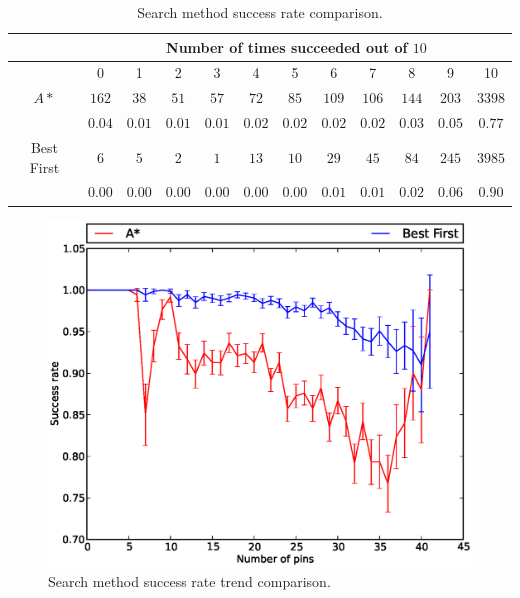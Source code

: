 \begin{table}[H]
\begin{center}
\begin{singlespace}
\begin{tabular}{|c||c|c|c|c|c|c|c|c|c|c|c|}
\hline
 & \multicolumn{11}{|c|}{Number of times succeeded out of $10$} \\
\hline
 & 0 & 1 & 2 & 3 & 4 & 5 & 6 & 7 & 8 & 9 & 10 \\
\hline\hline
$A*$ & $162$ & $38$ & $51$ & $57$ & $72$ & $85$ & $109$ & $106$ & $144$ & $203$ & $3398$ \\
 & $0.04$ & $0.01$ & $0.01$ & $0.01$ & $0.02$ & $0.02$ & $0.02$ & $0.02$ & $0.03$ & $0.05$ & $0.77$ \\
\hline
 Best First & $6$ & $5$ & $2$ & $1$ & $13$ & $10$ & $29$ & $45$ & $84$ & $245$ & $3985$ \\
  & $0.00$ & $0.00$ & $0.00$ & $0.00$ & $0.00$ & $0.00$ & $0.01$ & $0.01$ & $0.02$ & $0.06$ & $0.90$ \\
\hline
\end{tabular}
\end{singlespace}
\end{center}
\label{tb:search_success}
\caption[Search method success rate comparison]{Search method success rate
comparison.}
\end{table}

\begin{figure}[H]
\begin{center}
\includegraphics[width=\textwidth]{Images/search_success_trend_comparison.eps}
\caption[Search method success rate trend comparison]{Search method success rate
trend comparison.}
\label{fig:search_success_trend}
\end{center}
\end{figure}


